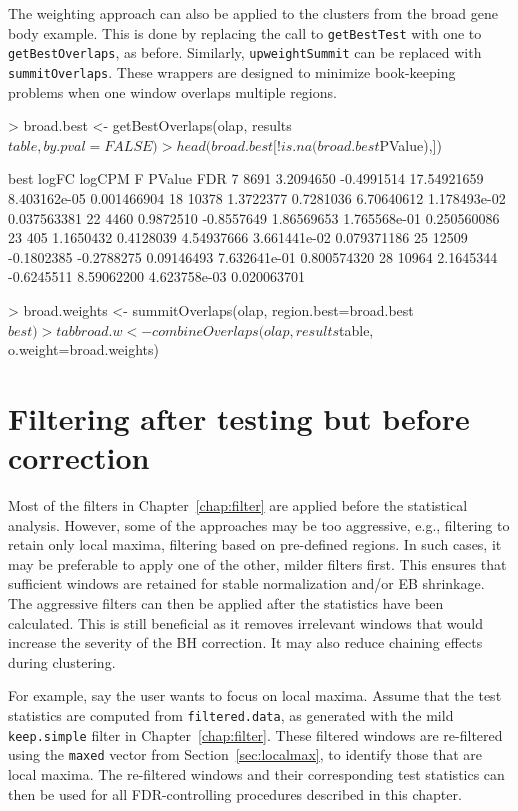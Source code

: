 \documentclass[12pt]{report}
\renewenvironment{Schunk}{\vspace{0pt}}{\vspace{0pt}}
\newcommand{\code}[1]{{\small\texttt{#1}}}
\begin{document}
The weighting approach can also be applied to the clusters from the broad gene body example.
This is done by replacing the call to \code{getBestTest} with one to \code{getBestOverlaps}, as before.
Similarly, \code{upweightSummit} can be replaced with \code{summitOverlaps}.
These wrappers are designed to minimize book-keeping problems when one window overlaps multiple regions.

\begin{Schunk}
\begin{Sinput}
> broad.best <- getBestOverlaps(olap, results$table, by.pval=FALSE)
> head(broad.best[!is.na(broad.best$PValue),])
\end{Sinput}
\begin{Soutput}
    best      logFC     logCPM           F       PValue         FDR
7   8691  3.2094650 -0.4991514 17.54921659 8.403162e-05 0.001466904
18 10378  1.3722377  0.7281036  6.70640612 1.178493e-02 0.037563381
22  4460  0.9872510 -0.8557649  1.86569653 1.765568e-01 0.250560086
23   405  1.1650432  0.4128039  4.54937666 3.661441e-02 0.079371186
25 12509 -0.1802385 -0.2788275  0.09146493 7.632641e-01 0.800574320
28 10964  2.1645344 -0.6245511  8.59062200 4.623758e-03 0.020063701
\end{Soutput}
\begin{Sinput}
> broad.weights <- summitOverlaps(olap, region.best=broad.best$best)
> tabbroad.w <- combineOverlaps(olap, results$table, o.weight=broad.weights) 
\end{Sinput}
\end{Schunk}

\section{Filtering after testing but before correction}
Most of the filters in Chapter~\ref{chap:filter} are applied before the statistical analysis.
However, some of the approaches may be too aggressive, e.g., filtering to retain only local maxima, filtering based on pre-defined regions.
In such cases, it may be preferable to apply one of the other, milder filters first.
This ensures that sufficient windows are retained for stable normalization and/or EB shrinkage.
The aggressive filters can then be applied after the statistics have been calculated.
This is still beneficial as it removes irrelevant windows that would increase the severity of the BH correction.
It may also reduce chaining effects during clustering.

For example, say the user wants to focus on local maxima.
Assume that the test statistics are computed from \code{filtered.data}, as generated with the mild \code{keep.simple} filter in Chapter~\ref{chap:filter}.
These filtered windows are re-filtered using the \code{maxed} vector from Section~\ref{sec:localmax}, to identify those that are local maxima.
The re-filtered windows and their corresponding test statistics can then be used for all FDR-controlling procedures described in this chapter.
\end{document}
